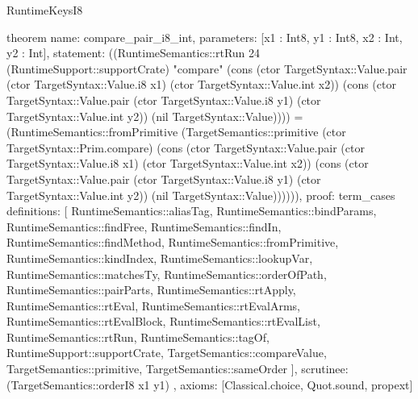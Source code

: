 \begin{lexlean}{RuntimeKeysI8}
\begin{semanticmodule}
theorem{
  name: compare_pair_i8_int,
  parameters: [x1 : Int8, y1 : Int8, x2 : Int, y2 : Int],
  statement: ((RuntimeSemantics::rtRun 24 (RuntimeSupport::supportCrate) "compare" (cons (ctor TargetSyntax::Value.pair (ctor TargetSyntax::Value.i8 x1) (ctor TargetSyntax::Value.int x2)) (cons (ctor TargetSyntax::Value.pair (ctor TargetSyntax::Value.i8 y1) (ctor TargetSyntax::Value.int y2)) (nil TargetSyntax::Value)))) = (RuntimeSemantics::fromPrimitive (TargetSemantics::primitive (ctor TargetSyntax::Prim.compare) (cons (ctor TargetSyntax::Value.pair (ctor TargetSyntax::Value.i8 x1) (ctor TargetSyntax::Value.int x2)) (cons (ctor TargetSyntax::Value.pair (ctor TargetSyntax::Value.i8 y1) (ctor TargetSyntax::Value.int y2)) (nil TargetSyntax::Value)))))),
  proof: term_cases{
    definitions: [
      RuntimeSemantics::aliasTag,
      RuntimeSemantics::bindParams,
      RuntimeSemantics::findFree,
      RuntimeSemantics::findIn,
      RuntimeSemantics::findMethod,
      RuntimeSemantics::fromPrimitive,
      RuntimeSemantics::kindIndex,
      RuntimeSemantics::lookupVar,
      RuntimeSemantics::matchesTy,
      RuntimeSemantics::orderOfPath,
      RuntimeSemantics::pairParts,
      RuntimeSemantics::rtApply,
      RuntimeSemantics::rtEval,
      RuntimeSemantics::rtEvalArms,
      RuntimeSemantics::rtEvalBlock,
      RuntimeSemantics::rtEvalList,
      RuntimeSemantics::rtRun,
      RuntimeSemantics::tagOf,
      RuntimeSupport::supportCrate,
      TargetSemantics::compareValue,
      TargetSemantics::primitive,
      TargetSemantics::sameOrder
    ],
    scrutinee: (TargetSemantics::orderI8 x1 y1)
  },
  axioms: [Classical.choice, Quot.sound, propext]
}


\end{semanticmodule}
\end{lexlean}
